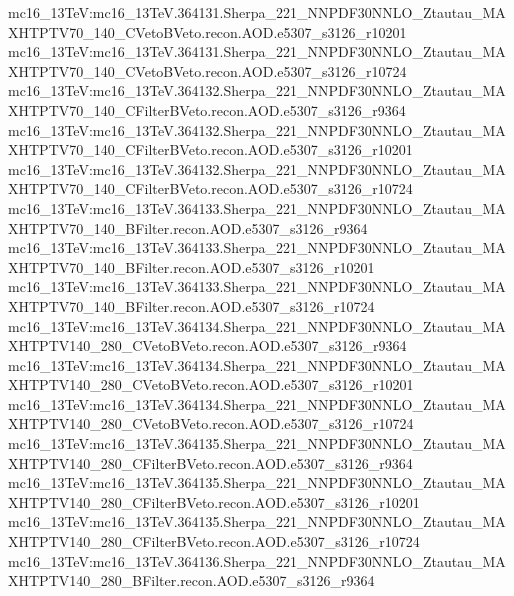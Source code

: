 { mc16\_13TeV:mc16\_13TeV.364131.Sherpa\_221\_NNPDF30NNLO\_Ztautau\_MAXHTPTV70\_140\_CVetoBVeto.recon.AOD.e5307\_s3126\_r10201 \newline 
 mc16\_13TeV:mc16\_13TeV.364131.Sherpa\_221\_NNPDF30NNLO\_Ztautau\_MAXHTPTV70\_140\_CVetoBVeto.recon.AOD.e5307\_s3126\_r10724 \newline   
 mc16\_13TeV:mc16\_13TeV.364132.Sherpa\_221\_NNPDF30NNLO\_Ztautau\_MAXHTPTV70\_140\_CFilterBVeto.recon.AOD.e5307\_s3126\_r9364 \newline   
 mc16\_13TeV:mc16\_13TeV.364132.Sherpa\_221\_NNPDF30NNLO\_Ztautau\_MAXHTPTV70\_140\_CFilterBVeto.recon.AOD.e5307\_s3126\_r10201  \newline  
 mc16\_13TeV:mc16\_13TeV.364132.Sherpa\_221\_NNPDF30NNLO\_Ztautau\_MAXHTPTV70\_140\_CFilterBVeto.recon.AOD.e5307\_s3126\_r10724\newline    
 mc16\_13TeV:mc16\_13TeV.364133.Sherpa\_221\_NNPDF30NNLO\_Ztautau\_MAXHTPTV70\_140\_BFilter.recon.AOD.e5307\_s3126\_r9364 \newline   
 mc16\_13TeV:mc16\_13TeV.364133.Sherpa\_221\_NNPDF30NNLO\_Ztautau\_MAXHTPTV70\_140\_BFilter.recon.AOD.e5307\_s3126\_r10201\newline    
 mc16\_13TeV:mc16\_13TeV.364133.Sherpa\_221\_NNPDF30NNLO\_Ztautau\_MAXHTPTV70\_140\_BFilter.recon.AOD.e5307\_s3126\_r10724   \newline 
 mc16\_13TeV:mc16\_13TeV.364134.Sherpa\_221\_NNPDF30NNLO\_Ztautau\_MAXHTPTV140\_280\_CVetoBVeto.recon.AOD.e5307\_s3126\_r9364  \newline  
 mc16\_13TeV:mc16\_13TeV.364134.Sherpa\_221\_NNPDF30NNLO\_Ztautau\_MAXHTPTV140\_280\_CVetoBVeto.recon.AOD.e5307\_s3126\_r10201 \newline  
 mc16\_13TeV:mc16\_13TeV.364134.Sherpa\_221\_NNPDF30NNLO\_Ztautau\_MAXHTPTV140\_280\_CVetoBVeto.recon.AOD.e5307\_s3126\_r10724 \newline   
 mc16\_13TeV:mc16\_13TeV.364135.Sherpa\_221\_NNPDF30NNLO\_Ztautau\_MAXHTPTV140\_280\_CFilterBVeto.recon.AOD.e5307\_s3126\_r9364\newline   
 mc16\_13TeV:mc16\_13TeV.364135.Sherpa\_221\_NNPDF30NNLO\_Ztautau\_MAXHTPTV140\_280\_CFilterBVeto.recon.AOD.e5307\_s3126\_r10201 \newline  
 mc16\_13TeV:mc16\_13TeV.364135.Sherpa\_221\_NNPDF30NNLO\_Ztautau\_MAXHTPTV140\_280\_CFilterBVeto.recon.AOD.e5307\_s3126\_r10724 \newline  
 mc16\_13TeV:mc16\_13TeV.364136.Sherpa\_221\_NNPDF30NNLO\_Ztautau\_MAXHTPTV140\_280\_BFilter.recon.AOD.e5307\_s3126\_r9364 \newline  
}

